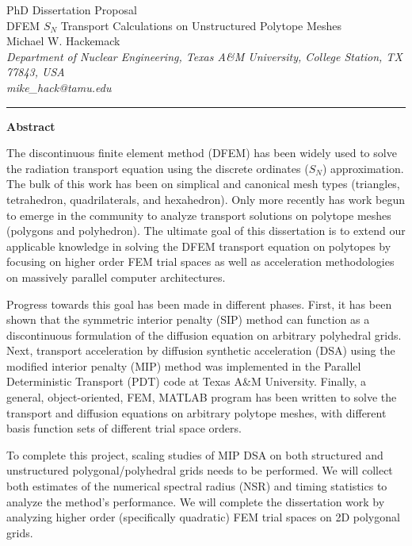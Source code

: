 \documentclass[11pt]{article}
\begin{document}
\begin{center}
{\Large PhD Dissertation Proposal}\\[6mm]
{\Large DFEM $S_N$ Transport Calculations on Unstructured Polytope Meshes}\\[8mm]
{Michael W. Hackemack} \\[2mm]
{\em \small Department of Nuclear Engineering, Texas A\&M University, College Station, TX 77843, USA} \\[1mm]
{\em mike\_hack@tamu.edu} \\[6mm]
\end{center}

\noindent\rule{6.25in}{0.4pt}

{\Large \bf Abstract}
\vspace{2mm}

The discontinuous finite element method (DFEM) has been widely used to solve the radiation transport equation using the discrete ordinates ($S_N$) approximation. The bulk of this work has been on simplical and canonical mesh types (triangles, tetrahedron, quadrilaterals, and hexahedron). Only more recently has work begun to emerge in the community to analyze transport solutions on polytope meshes (polygons and polyhedron). The ultimate goal of this dissertation is to extend our applicable knowledge in solving the DFEM transport equation on polytopes by focusing on higher order FEM trial spaces as well as acceleration methodologies on massively parallel computer architectures.

Progress towards this goal has been made in different phases. First, it has been shown that the symmetric interior penalty (SIP) method can function as a discontinuous formulation of the diffusion equation on arbitrary polyhedral grids. Next, transport acceleration by diffusion synthetic acceleration (DSA) using the modified interior penalty (MIP) method was implemented in the Parallel Deterministic Transport (PDT) code at Texas A\&M University. Finally, a general, object-oriented, FEM, MATLAB program has been written to solve the transport and diffusion equations on arbitrary polytope meshes, with different basis function sets of different trial space orders.

To complete this project, scaling studies of MIP DSA on both structured and unstructured polygonal/polyhedral grids needs to be performed. We will collect both estimates of the numerical spectral radius (NSR) and timing statistics to analyze the method's performance. We will complete the dissertation work by analyzing higher order (specifically quadratic) FEM trial spaces on 2D polygonal grids.
\end{document}
